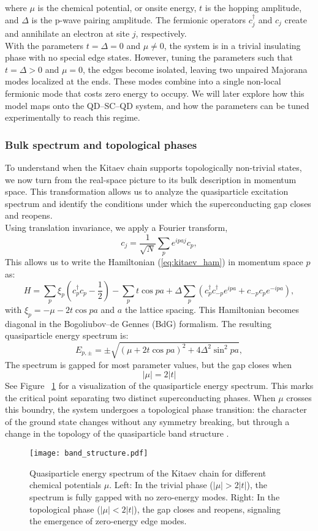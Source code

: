 \documentclass[11pt, letterpaper, titlepage]{article}
\begin{document}
where $μ$ is the chemical potential, or onsite energy, $t$ is the hopping amplitude, and $Δ$ is the p-wave pairing amplitude. The fermionic operators $c_j^\dagger$ and $c_j$ create and annihilate an electron at site $j$, respectively.\\
With the parameters $t=Δ=0$ and $μ ≠ 0$, the system is in a trivial insulating phase with no special edge states. However, tuning the parameters such that $t = Δ > 0$ and $μ = 0$, the edges become isolated, leaving two unpaired Majorana modes localized at the ends. These modes combine into a single non-local fermionic mode that costs zero energy to occupy. We will later explore how this model maps onto the QD–SC–QD system, and how the parameters can be tuned experimentally to reach this regime. 


\subsubsection{Bulk spectrum and topological phases}
To understand when the Kitaev chain supports topologically non-trivial states, we now turn from the real-space picture to its bulk description in momentum space. This transformation allows us to analyze the quasiparticle excitation spectrum and identify the conditions under which the superconducting gap closes and reopens.\\
Using translation invariance, we apply a Fourier transform,
$$
c_j = \frac{1}{\sqrt{N}} \sum_p e^{ipaj} c_p,
$$
This allows us to write the Hamiltonian (\ref{eq:kitaev_ham}) in momentum space $p$ as:
\begin{equation}
H = ∑_{ p}^{} ξ_p\left(c_p^{†} c_p - \frac{1}{2}\right) - ∑_{p}^{} t \cos p a + Δ ∑_{p}^{}\left(c_p^{†} c_{-p}^{†} e^{ipa} + c_{-p} c_p e^{-ipa}\right), 
\end{equation}
with $ξ_p = -μ - 2t \cos pa$ and $a$ the lattice spacing. This Hamiltonian becomes diagonal in the Bogoliubov–de Gennes (BdG) formalism. The resulting quasiparticle energy spectrum is:
\begin{equation}
  E_{p,\pm} = \pm \sqrt{(μ + 2t \cos{pa})^2 + 4Δ^2 \sin^2{pa}},
\end{equation}
The spectrum is gapped for most parameter values, but the gap closes when
$$
|μ| = 2|t|
$$
See Figure ~\ref{fig:kitaev_bands} for a visualization of the quasiparticle energy spectrum. This marks the critical point separating two distinct superconducting phases. When $μ$ crosses this boundry, the system undergoes a topological phase transition: the character of the ground state changes without any symmetry breaking, but through a change in the topology of the quasiparticle band structure \cite{Qtech}.\\
\begin{figure}
  \texttt{[image: band\_structure.pdf]}
  \caption{Quasiparticle energy spectrum of the Kitaev chain for different chemical potentials $μ$. Left: In the trivial phase ($|μ| > 2|t|$), the spectrum is fully gapped with no zero-energy modes. Right: In the topological phase ($|μ| < 2|t|$), the gap closes and reopens, signaling the emergence of zero-energy edge modes.}
  \label{fig:kitaev_bands}
\end{figure}
\end{document}
